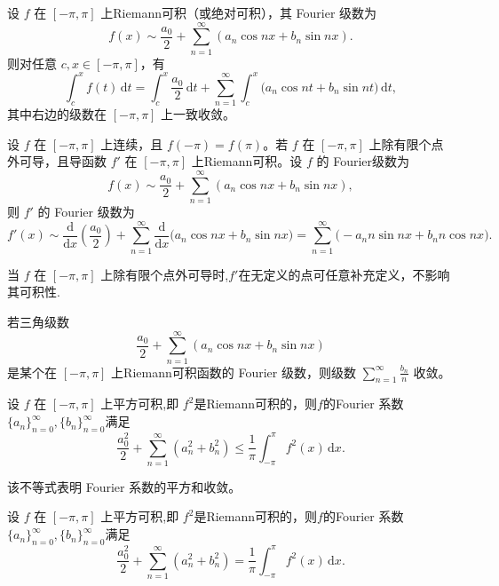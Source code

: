 \documentclass[../../main.tex]{subfiles}%
\begin{document}
\begin{theorem}[Fourier级数的逐项积分定理]\label{theorem:Fourier级数的逐项积分定理}
设 $f$ 在 $[-\pi,\pi]$ 上Riemann可积（或绝对可积），其 Fourier 级数为
\[
f(x)\sim\frac{a_0}{2}+\sum_{n=1}^{\infty}(a_n\cos nx + b_n\sin nx).
\]
则对任意 $c,x\in[-\pi,\pi]$，有
\[
\int_{c}^{x}f(t)\,\mathrm{d}t
= \int_{c}^{x}\frac{a_0}{2}\,\mathrm{d}t
+ \sum_{n=1}^{\infty}\int_{c}^{x}\bigl(a_n\cos nt + b_n\sin nt\bigr)\,\mathrm{d}t,
\]
其中右边的级数在 $[-\pi,\pi]$ 上一致收敛。
\end{theorem}

\begin{theorem}[Fourier级数的逐项微分定理]\label{theorem:Fourier级数的逐项微分定理}
设 $f$ 在 $[-\pi,\pi]$ 上连续，且 $f(-\pi)=f(\pi)$。若 $f$ 在 $[-\pi,\pi]$ 上除有限个点外可导，且导函数 $f'$ 在 $[-\pi,\pi]$ 上Riemann可积。设 $f$ 的 Fourier级数为
\[
f(x)\sim\frac{a_0}{2}+\sum_{n=1}^{\infty}(a_n\cos nx + b_n\sin nx),
\]
则 $f'$ 的 Fourier 级数为
\[
f'(x)\sim \frac{\mathrm{d}}{\mathrm{d}x}\left(\frac{a_0}{2}\right)
+\sum_{n=1}^{\infty}\frac{\mathrm{d}}{\mathrm{d}x}\bigl(a_n\cos nx + b_n\sin nx\bigr)
= \sum_{n=1}^{\infty}\bigl(-a_n n\sin nx + b_n n\cos nx\bigr).
\]
\end{theorem}
\begin{remark}
当 $f$ 在 $[-\pi,\pi]$ 上除有限个点外可导时,$f'$在无定义的点可任意补充定义，不影响其可积性.
\end{remark}

\begin{corollary}
若三角级数
$$
\frac{a_0}{2}+\sum_{n=1}^{\infty}(a_n\cos nx + b_n\sin nx)
$$
是某个在 $[-\pi,\pi]$ 上Riemann可积函数的 Fourier 级数，则级数 $\sum_{n=1}^{\infty}\frac{b_n}{n}$ 收敛。
\end{corollary}

\begin{theorem}[Bessel不等式]\label{theorem:Bessel不等式}
设 $f$ 在 $[-\pi,\pi]$ 上平方可积,即 $f^2$是Riemann可积的，则$f$的Fourier 系数$\{a_n\}_{n=0}^{\infty},\{b_n\}_{n=0}^{\infty}$满足
\[
\frac{a_0^2}{2}+\sum_{n=1}^{\infty}(a_n^2 + b_n^2)\leqslant \frac{1}{\pi}\int_{-\pi}^{\pi}f^2(x)\,\mathrm{d}x.
\]
\end{theorem}
\begin{remark}
该不等式表明 Fourier 系数的平方和收敛。
\end{remark}

\begin{theorem}[Parseval恒等式]\label{theorem:Parseval恒等式}
设 $f$ 在 $[-\pi,\pi]$ 上平方可积,即 $f^2$是Riemann可积的，则$f$的Fourier 系数$\{a_n\}_{n=0}^{\infty},\{b_n\}_{n=0}^{\infty}$满足
\[
\frac{a_0^2}{2}+\sum_{n=1}^{\infty}(a_n^2 + b_n^2)=\frac{1}{\pi}\int_{-\pi}^{\pi}f^2(x)\,\mathrm{d}x.
\]
\end{theorem}
\end{document}
